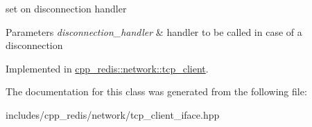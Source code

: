 set on disconnection handler


\begin{DoxyParams}{Parameters}
{\em disconnection\+\_\+handler} & handler to be called in case of a disconnection \\
\hline
\end{DoxyParams}


Implemented in \hyperlink{classcpp__redis_1_1network_1_1tcp__client_a24ccdf6dc467aac13cb832a395adb38d}{cpp\+\_\+redis\+::network\+::tcp\+\_\+client}.



The documentation for this class was generated from the following file\+:\begin{DoxyCompactItemize}
\item 
includes/cpp\+\_\+redis/network/tcp\+\_\+client\+\_\+iface.\+hpp\end{DoxyCompactItemize}
